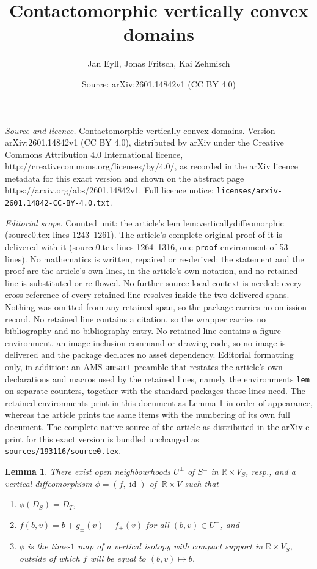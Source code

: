 \documentclass[10pt,a4paper]{amsart}
\title{Contactomorphic vertically convex domains}
\author{Jan Eyll, Jonas Fritsch, Kai Zehmisch}
\date{Source: arXiv:2601.14842v1 (CC BY 4.0)}
\newtheorem{lem}{Lemma}
\newcommand{\R}{\mathbb R}
\DeclareMathOperator{\id}{\mathrm{id}}
\begin{document}
\maketitle

\noindent\emph{Source and licence.} Contactomorphic vertically convex domains. Version arXiv:2601.14842v1 (CC BY 4.0), distributed by arXiv under the Creative Commons Attribution 4.0 International licence, http://creativecommons.org/licenses/by/4.0/, as recorded in the arXiv licence metadata for this exact version and shown on the abstract page https://arxiv.org/abs/2601.14842v1. Full licence notice: \texttt{licenses/arxiv-2601.14842-CC-BY-4.0.txt}.\par\smallskip

\noindent\textit{Editorial scope.} Counted unit: the article's lem lem:verticallydiffeomorphic (source0.tex lines 1243--1261). The article's complete original proof of it is delivered with it (source0.tex lines 1264--1316, one \texttt{proof} environment of 53 lines). No mathematics is written, repaired or re-derived: the statement and the proof are the article's own lines, in the article's own notation, and no retained line is substituted or re-flowed.  No further source-local context is needed: every cross-reference of every retained line resolves inside the two delivered spans.  Nothing was omitted from any retained span, so the package carries no omission record.  No retained line contains a citation, so the wrapper carries no bibliography and no bibliography entry.  No retained line contains a figure environment, an image-inclusion command or drawing code, so no image is delivered and the package declares no asset dependency.  Editorial formatting only, in addition: an AMS \texttt{amsart} preamble that restates the article's own declarations and macros used by the retained lines, namely the environments \texttt{lem} on separate counters, together with the standard packages those lines need.  The retained environments print in this document as Lemma 1 in order of appearance, whereas the article prints the same items with the numbering of its own full document.  The complete native source of the article as distributed in the arXiv e-print for this exact version is bundled unchanged as \texttt{sources/193116/source0.tex}.
\begin{lem}
\label{lem:verticallydiffeomorphic}
  There exist open neighbourhoods $U^{\pm}\!$ of
  $S^{\pm}$ in $\R\times V_S$, resp.,
  and a vertical diffeomorphism $\phi=(f,\id)$ of
  $\;\R\times V$
  such that
  	\begin{enumerate}
 	\item[(i)]
  		$\phi(D_S)=D_T$,
 	\item[(ii)]
		$f(b,v)=b+g_{\pm}(v)-f_{\pm}(v)$
		for all $(b,v)\in U^{\pm}$, and
 	\item[(iii)]
		$\phi$ is the time-$1$ map of a vertical isotopy
		with compact support in $\R\times V_S$,
		outside of which $f$ will be equal to $(b,v)\mapsto b$.
  	\end{enumerate}
\end{lem}
\end{document}
